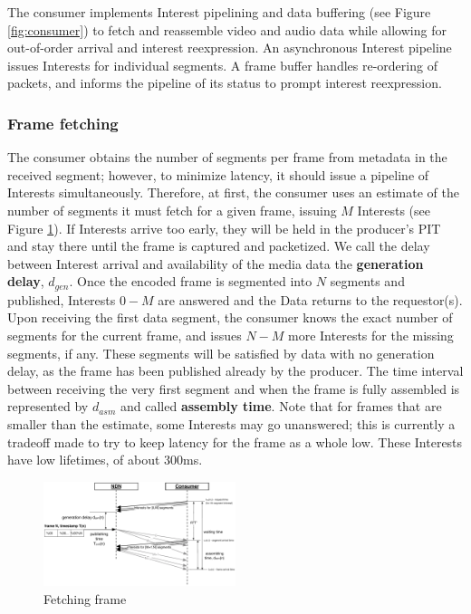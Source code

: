 \documentclass{icn/sig-alternate-2012} %
\begin{document}
The consumer implements Interest pipelining and data buffering (see Figure \ref{fig:consumer}) to fetch and reassemble video and audio data while allowing for out-of-order arrival and interest reexpression. An asynchronous Interest pipeline issues Interests for individual segments. A frame buffer handles re-ordering of packets, and informs the pipeline of its status to prompt interest reexpression.


\subsubsection{Frame fetching}

The consumer obtains the number of segments per frame from metadata in the received segment; however, to minimize latency, it should issue a pipeline of Interests simultaneously.  Therefore, at first, the consumer uses an estimate of the number of segments it must fetch for a given frame, issuing $M$ Interests (see Figure \ref{fig:pull}). If Interests arrive too early, they will be held in the producer's PIT and stay there until the frame is captured and packetized. We call the delay between Interest arrival and availability of the media data the \textbf{generation delay}, $d_{gen}$. Once the encoded frame is segmented into $N$ segments and published, Interests $0 - M$ are answered and the Data returns to the requestor(s). Upon receiving the first data segment, the consumer knows the exact number of segments for the current frame, and issues $N - M$ more Interests for the missing segments, if any. These segments will be satisfied by data with no generation delay, as the frame has been published already by the producer. The time interval between receiving the very first segment and when the frame is fully assembled is represented by $d_{asm}$ and called \textbf{assembly time}. Note that for frames that are smaller than the estimate, some Interests may go unanswered; this is currently a tradeoff made to try to keep latency for the frame as a whole low. These Interests have low lifetimes, of about 300ms. 
 

\begin{figure}[t!]
\centering
\includegraphics[width=0.5\textwidth]{frame-fetch}
\vspace{-18pt}
\caption{Fetching frame}
\label{fig:pull}
\end{figure}
\end{document}
